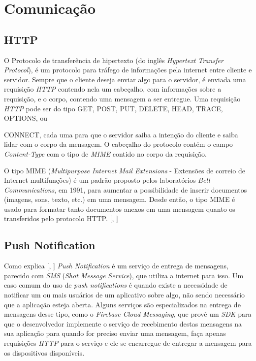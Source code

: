 \documentclass[
	12pt,				%
	oneside,			%
	a4paper,			%
	brazil				%
]{abntex2}
\newcommand{\citecustom}[1]{[\citeauthoronline{#1}, \citeyear{#1}]}
\begin{document}
\section{Comunicação}

\subsection{HTTP}

O Protocolo de transferência de hipertexto (do inglês \textit{Hypertext Transfer Protocol}), é um protocolo para tráfego de informações pela internet entre cliente e servidor. Sempre que o cliente deseja enviar algo para o servidor, é enviada uma requisição \textit{HTTP} contendo nela um cabeçalho, com informações sobre a requisição, e o corpo, contendo uma mensagem a ser entregue. Uma requisição \textit{HTTP} pode ser do tipo GET, POST, PUT, DELETE, HEAD, TRACE, OPTIONS, ou {CONNECT, cada uma para que o servidor saiba a intenção do cliente e saiba lidar com o corpo da mensagem.
O cabeçalho do protocolo contém o campo \textit{Content-Type} com o tipo de \textit{MIME} contido no corpo da requisição. 

O tipo MIME (\textit{Multipurpose Internet Mail Extensions} - Extensões de correio de Internet multifunções) é um padrão proposto pelos laboratórios \textit{Bell Communications}, em 1991, para aumentar a possibilidade de inserir documentos (imagens, sons, texto, etc.) em uma mensagem. Desde então, o tipo MIME é usado para formatar tanto documentos anexos em uma mensagem quanto os transferidos pelo protocolo HTTP. \citecustom{CCM2017}

\subsection{Push Notification}

Como explica \citecustom{Finzi2016}
 \textit{Push Notification} é um serviço de entrega de mensagens, parecido com \textit{SMS} (\textit{Shot Message Service}), que utiliza a internet para isso. Um caso comum do uso de \textit{push notifications} é quando existe a necessidade de notificar um ou mais usuários de um aplicativo sobre algo, não sendo necessário que a aplicação esteja aberta. Alguns serviços são especializados na entrega de mensagens desse tipo, como o \textit{Firebase Cloud Messaging}, que provê um \textit{SDK} para que o desenvolvedor implemente o serviço de recebimento destas mensagens na sua aplicação para quando for preciso enviar uma mensagem, faça apenas requisições \textit{HTTP} para o serviço e ele se encarregue de entregar a mensagem para os dispositivos disponíveis.

}
\end{document}
